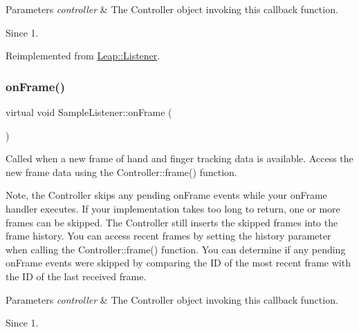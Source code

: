 \begin{DoxyParams}{Parameters}
{\em controller} & The Controller object invoking this callback function. \\
\hline
\end{DoxyParams}
\begin{DoxySince}{Since}
1. 
\end{DoxySince}


Reimplemented from \hyperlink{class_leap_1_1_listener_a7bcae44a40674c3f1e367b911201d252}{Leap\+::\+Listener}.

\mbox{\label{class_sample_listener_a9ae2f07da65353a8bda75c6807ecee35}} 
\subsubsection{\texorpdfstring{on\+Frame()}{onFrame()}\hspace{0.1cm}{\footnotesize\ttfamily [1/2]}}
{\footnotesize\ttfamily virtual void Sample\+Listener\+::on\+Frame (\begin{DoxyParamCaption}\item[{const \hyperlink{class_leap_1_1_controller}{Controller} \&}]{ }\end{DoxyParamCaption})\hspace{0.3cm}{\ttfamily [virtual]}}

Called when a new frame of hand and finger tracking data is available. Access the new frame data using the Controller\+::frame() function.


\begin{DoxyCodeInclude}
\end{DoxyCodeInclude}


Note, the Controller skips any pending on\+Frame events while your on\+Frame handler executes. If your implementation takes too long to return, one or more frames can be skipped. The Controller still inserts the skipped frames into the frame history. You can access recent frames by setting the history parameter when calling the Controller\+::frame() function. You can determine if any pending on\+Frame events were skipped by comparing the ID of the most recent frame with the ID of the last received frame.


\begin{DoxyParams}{Parameters}
{\em controller} & The Controller object invoking this callback function. \\
\hline
\end{DoxyParams}
\begin{DoxySince}{Since}
1. 
\end{DoxySince}


